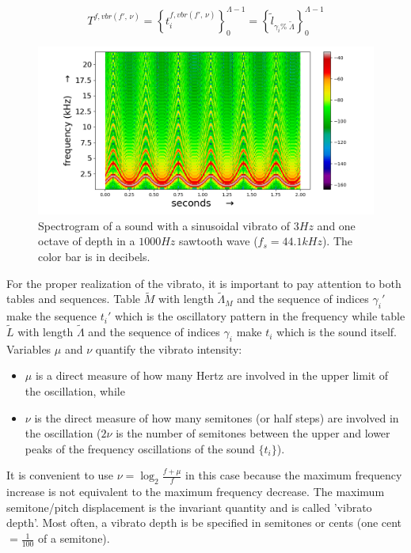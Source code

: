 \begin{equation}\label{vbrT}
 T^{f, vbr(f',\,\nu)}=\left\{ t_i^{f,vbr(f',\,\nu)} \right\}_0^{\Lambda-1}=\left\{ \widetilde{l}_{\gamma_i \%\; \widetilde{\Lambda} } \right\}_0^{\Lambda-1}
\end{equation}

\begin{figure}[h!]
     \centering
         \includegraphics[width=\columnwidth]{figures/vibrato_}
     \caption{Spectrogram of a sound with a sinusoidal vibrato of $3Hz$ and one octave of depth in a $1000Hz$ sawtooth wave ($f_s=44.1kHz$). The color bar is in decibels.}
         \label{fig:vibrato}
\end{figure}

For the proper realization of the vibrato, it is important to pay attention to both tables and sequences. Table $\widetilde{M}$ with length $\widetilde{\Lambda}_M$ and the sequence of indices $\gamma_i'$ make the sequence $t_i'$ which is the oscillatory pattern in the frequency while table $\widetilde{L}$ with length $\widetilde{\Lambda}$ and the sequence of indices $\gamma_i$ make $t_i$ which is the sound itself. Variables $\mu$ and $\nu$ quantify the vibrato intensity:
\begin{itemize}
    \item $\mu$ is a direct measure of how many Hertz are involved in the upper limit of the oscillation, while
    \item $\nu$ is the direct measure of how many semitones (or half steps) are involved in the oscillation ($2\nu$ is the number of semitones between the upper and lower peaks of the frequency oscillations of the sound $\{t_i\}$).
\end{itemize}

It is convenient to use $\nu=\log_{2}\frac{f+\mu}{f} $ in this case because the maximum frequency increase is not equivalent to the maximum frequency decrease.
The maximum semitone/pitch displacement is the invariant quantity
and is called 'vibrato depth'.
Most often, a vibrato depth is be specified in semitones or cents (one cent $= \frac{1}{100}$ of a semitone).

